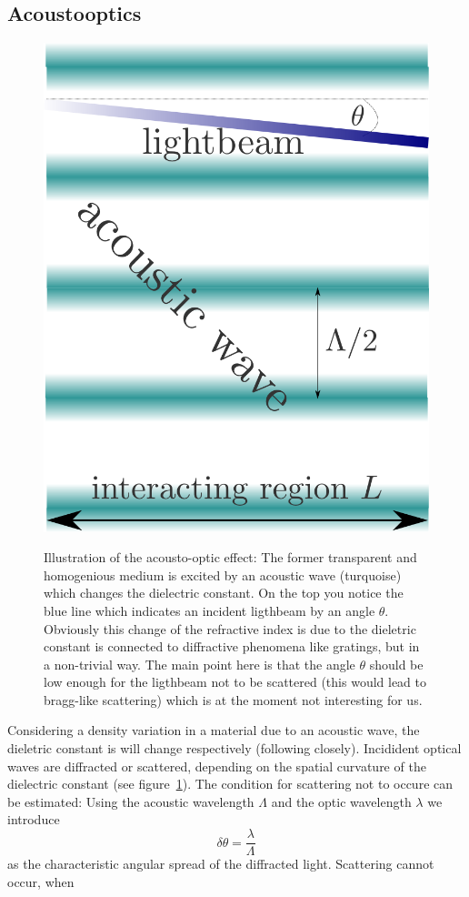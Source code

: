 \subsection{Acoustooptics}
\begin{figure}
    \centering
    \caption{Illustration of the acousto-optic effect: The former transparent and homogenious medium is
        excited by an acoustic wave (turquoise) which changes the dielectric constant. On the top you notice
        the blue line which indicates an incident ligthbeam by an angle $\theta$. Obviously this change
        of the refractive index is due to the dieletric constant is connected to diffractive phenomena like
        gratings, but in a non-trivial way. The main point here is that the angle $\theta$ should be low enough
        for the ligthbeam not to be scattered (this would lead to bragg-like scattering) which is at the moment
        not interesting for us. }
    \includegraphics[width=0.5\linewidth]{figures/ramannath1.png}
    \label{fig:ramannath1}
\end{figure}
Considering a density variation in a material due to an acoustic wave, the dieletric constant is will
change respectively (following \cite{boyd2003nonlinear} closely). 
Incidident optical waves are diffracted or scattered, depending on the spatial curvature
of the dielectric constant (see figure~\ref{fig:ramannath1}). The condition for scattering not to occure can
be estimated: Using the acoustic wavelength $\Lambda$ and the optic wavelength $\lambda$ we introduce 
\begin{equation}
    \label{eq:deltatheta}
    \delta \theta = \frac{\lambda}{\Lambda}
\end{equation}
as the characteristic angular spread of the diffracted light. Scattering cannot occur, when 
